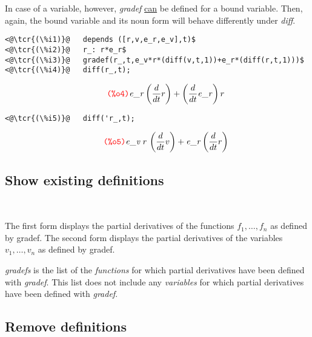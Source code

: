 \documentclass[../Maxima_Workbook.tex]{subfiles}
\begin{document}
\lz In case of a variable, however, \emph{gradef} \underline{can} be defined for a bound variable. Then, again, the bound variable and its noun form will behave differently under \emph{diff}.

\lz \begin{small}
\color{blue} \leqn
\begin{lstlisting}
<@\tcr{(\%i1)}@   depends ([r,v,e_r,e_v],t)$
<@\tcr{(\%i2)}@   r_: r*e_r$
<@\tcr{(\%i3)}@   gradef(r_,t,e_v*r*(diff(v,t,1))+e_r*(diff(r,t,1)))$
<@\tcr{(\%i4)}@   diff(r_,t);
\end{lstlisting}
\vspace{-4mm} \[\tag*{\tcr{\ttfamily (\%o4)}} \mathit{e\_ r} \left( \frac{d}{d t} r\right) +\left( \frac{d}{d t} \mathit{e\_ r}\right)  r \]
\vspace{-5mm} \begin{lstlisting}
<@\tcr{(\%i5)}@   diff('r_,t);
\end{lstlisting}
\vspace{-4mm} \[\tag*{\tcr{\ttfamily (\%o5)}} \mathit{e\_ v} \; r\, \left( \frac{d}{d t} v\right) +\mathit{e\_ r} \left( \frac{d}{d t} r\right) \]
\color{black} \reqn
\end{small} \vspace{-4mm}

\subsection{Show existing definitions}

\lz {} \\
 \hfill \tcr{[function]}

\lz The first form displays the partial derivatives of the functions $ f_1,\dots,f_n $  as defined by gradef. The second form displays the partial derivatives of the
variables $ v_1,\dots,v_n $ as defined by gradef.

\lzz {} \hfill {}

\lz \emph{gradefs} is the list of the \emph{functions} for which partial derivatives have been defined with \emph{gradef}. This list does not include any \emph{variables} for which partial derivatives have been defined with \emph{gradef}.

\subsection{Remove definitions}
\end{document}
